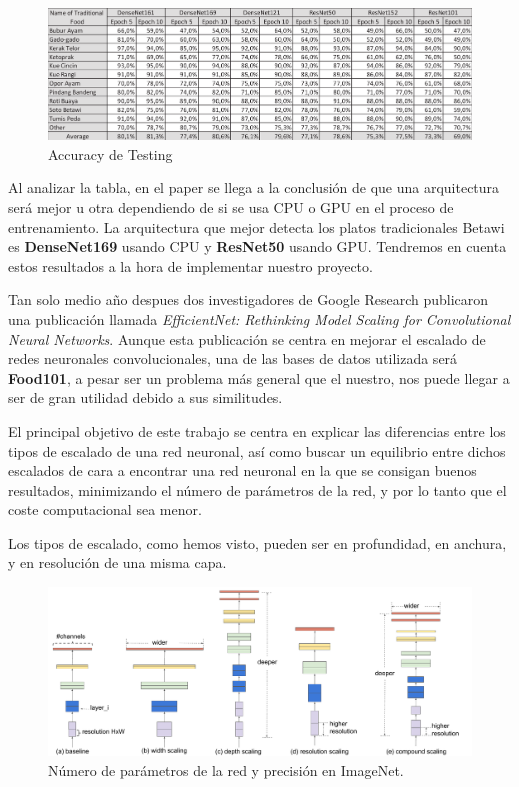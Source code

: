 \vspace{5 mm}

\begin{figure}[H]
  \centering
  \includegraphics[width=1\linewidth]{Imagenes/tablapaper1.png}
  \caption{Accuracy de Testing}
  \label{fig:sub-first}
\end{figure}

\vspace{5 mm}

Al analizar la tabla, en el paper se llega a la conclusión de que una arquitectura será mejor u otra dependiendo de si se usa CPU o GPU en el proceso de entrenamiento. La arquitectura que mejor detecta los platos tradicionales Betawi es \textbf{DenseNet169} usando CPU y \textbf{ResNet50} usando GPU. Tendremos en cuenta estos resultados a la hora de implementar nuestro proyecto.

\newpage

Tan solo medio año despues dos investigadores de Google Research publicaron una publicación llamada \textit{EfficientNet: Rethinking Model Scaling for Convolutional Neural Networks}\cite{efficient}. Aunque esta publicación se centra en mejorar el escalado de redes neuronales convolucionales, una de las bases de datos utilizada será \textbf{Food101}, a pesar ser un problema más general que el nuestro, nos puede llegar a ser de gran utilidad debido a sus similitudes.

El principal objetivo de este trabajo se centra en explicar las diferencias entre los tipos de escalado de una red neuronal, así como buscar un equilibrio entre dichos escalados de cara a encontrar una red neuronal en la que se consigan buenos resultados, minimizando el número de parámetros de la red, y por lo tanto que el coste computacional sea menor.

Los tipos de escalado, como hemos visto, pueden ser en profundidad, en anchura, y en resolución de una misma capa.


\begin{figure}[H]
  \centering
  \includegraphics[width=1\linewidth]{Imagenes/scalecompare.pdf}
  \caption{Número de parámetros de la red y precisión en ImageNet.}
  \label{fig:param-precision}
\end{figure}


